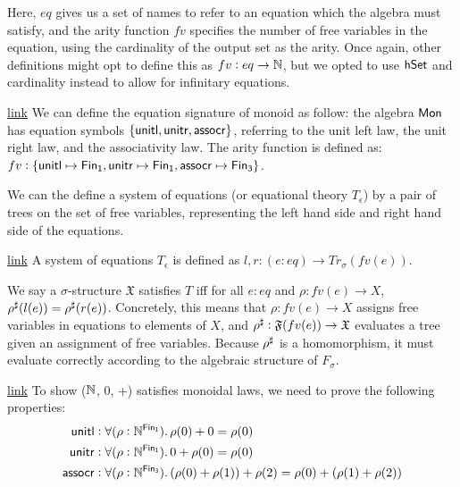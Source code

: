Here, $eq$ gives us a set of names to refer to an equation which
the algebra must satisfy, and the arity function $fv$ specifies the 
number of free variables in the equation, using the cardinality of the
output set as the arity. Once again, other definitions might opt to
define this as $fv : eq \to \mathbb{N}$, but we opted to use $\mathsf{hSet}$ and
cardinality instead to allow for infinitary equations.

\begin{example}{\href{https://windtfw.com/agda-symmetries/Cubical.Structures.Set.Mon.Desc.html#1684}{link}}
We can define the equation signature of monoid as follow: the algebra
$\mathsf{Mon}$ has equation symbols $\{\operatorname{\mathsf{unitl}}, \operatorname{\mathsf{unitr}}, \operatorname{\mathsf{assocr}}\}$,
referring to the unit left law, the unit right law, and the associativity law.
The arity function is defined as:
$fv : \{ \term{unitl} \mapsto \Fin[1], \term{unitr} \mapsto \Fin[1], \term{assocr} \mapsto \Fin[3] \}$.
\end{example}

We can the define a system of equations (or equational theory $T_\epsilon$)
by a pair of trees on the set of free variables, representing the
left hand side and right hand side of the equations.
\begin{definition}{\href{https://windtfw.com/agda-symmetries/Cubical.Structures.Eq.html#1499}{link}}
A system of equations $T_\epsilon$ is defined as
$l, r : (e : eq) \to Tr_\sigma(fv(e))$.
\end{definition}

We say a $\sigma$-structure $\mathfrak{X}$ satisfies $T$
iff for all $e : eq$ and
$\rho : fv(e) \to X$, ${\rho}^{\sharp}(l(e)) = {\rho}^{\sharp}(r(e))$.
Concretely, this means that $\rho : fv(e) \to X$ assigns
free variables in equations to elements of $X$, and
${\rho}^{\sharp} : \mathfrak{F}(fv(e)) \to \mathfrak{X}$ evaluates
a tree given an assignment of free variables. Because ${\rho}^{\sharp}$
is a homomorphism, it must evaluate correctly according to the
algebraic structure of $F_\sigma$.

\begin{example}{\href{https://windtfw.com/agda-symmetries/Cubical.Structures.Set.Mon.Desc.html#6382}{link}}
To show ($\mathbb{N}$, 0, +) satisfies monoidal laws, we need to prove
the following properties:
\begin{align*}
\term{unitl}  & : \forall (\rho : \Nat^{\Fin[1]}). \, \rho(0) + 0 \id \rho(0) \\
\term{unitr}  & : \forall (\rho : \Nat^{\Fin[1]}). \, 0 + \rho(0) \id \rho(0) \\
\term{assocr} & : \forall (\rho : \Nat^{\Fin[3]}). \, (\rho(0) + \rho(1)) + \rho(2) \id \rho(0) + (\rho(1) + \rho(2))
\end{align*} 
\end{example}

